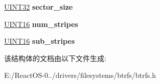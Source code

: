 \begin{DoxyCompactItemize}
\hyperlink{_processor_bind_8h_ae1e6edbbc26d6fbc71a90190d0266018}{U\+I\+N\+T32} {\bfseries sector\+\_\+size}
\item 
\mbox{\label{struct_c_h_u_n_k___i_t_e_m_a81605ebcc0c9604654e566d6c6df30c0}} 
\hyperlink{_processor_bind_8h_a09f1a1fb2293e33483cc8d44aefb1eb1}{U\+I\+N\+T16} {\bfseries num\+\_\+stripes}
\item 
\mbox{\label{struct_c_h_u_n_k___i_t_e_m_af7f9fcc2a58298c98684d52de58ce23c}} 
\hyperlink{_processor_bind_8h_a09f1a1fb2293e33483cc8d44aefb1eb1}{U\+I\+N\+T16} {\bfseries sub\+\_\+stripes}
\end{DoxyCompactItemize}


该结构体的文档由以下文件生成\+:\begin{DoxyCompactItemize}
\item 
E\+:/\+React\+O\+S-\/0../drivers/filesystems/btrfs/btrfs.\+h\end{DoxyCompactItemize}
